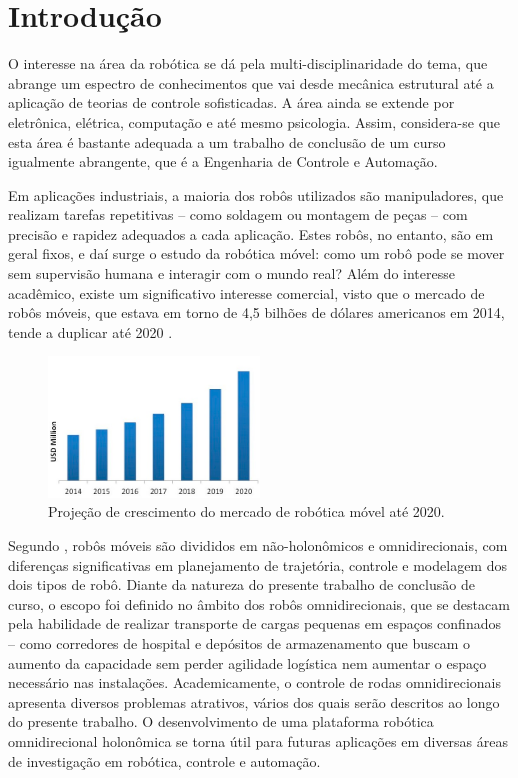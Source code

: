 \section{Introdução}


O interesse na área da robótica se dá pela multi-disciplinaridade do tema, que abrange um espectro de conhecimentos que vai desde mecânica estrutural até a aplicação de teorias de controle sofisticadas. A área ainda se extende por eletrônica, elétrica, computação e até mesmo psicologia. Assim, considera-se que esta área é bastante adequada a um trabalho de conclusão de um curso igualmente abrangente, que é a Engenharia de Controle e Automação.

Em aplicações industriais, a maioria dos robôs utilizados são manipuladores, que realizam tarefas repetitivas -- como soldagem ou montagem de peças -- com precisão e rapidez adequados a cada aplicação. Estes robôs, no entanto, são em geral fixos, e daí surge o estudo da robótica móvel: como um robô pode se mover sem supervisão humana e interagir com o mundo real? \citep{siegwart2011introduction} Além do interesse acadêmico, existe um significativo interesse comercial, visto que o mercado de robôs móveis, que estava em torno de 4,5 bilhões de dólares americanos em 2014, tende a duplicar até 2020 \citep{marketsmarkets}.

\begin{figure}[h]
  \centering
  \includegraphics[width = 0.5\textwidth]{imagens/markets}
  \caption{Projeção de crescimento do mercado de robótica móvel até 2020.}
  \label{fig:markets}
\end{figure}

Segundo \citet{lynch2017modern}, robôs móveis são divididos em não-holonômicos e omnidirecionais, com diferenças significativas em planejamento de trajetória, controle e modelagem dos dois tipos de robô. Diante da natureza do presente trabalho de conclusão de curso, o escopo foi definido no âmbito dos robôs omnidirecionais, que se destacam pela habilidade de realizar transporte de cargas pequenas em espaços confinados -- como corredores de hospital e depósitos de armazenamento que buscam o aumento da capacidade sem perder agilidade logística nem aumentar o espaço necessário nas instalações. Academicamente, o controle de rodas omnidirecionais apresenta diversos problemas atrativos, vários dos quais serão descritos ao longo do presente trabalho. O desenvolvimento de uma plataforma robótica omnidirecional holonômica se torna útil para futuras aplicações em diversas áreas de investigação em robótica, controle e automação.

